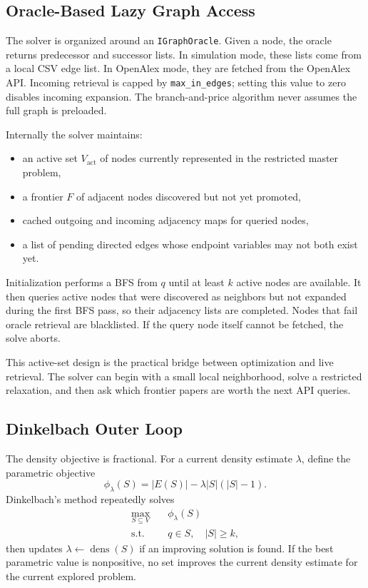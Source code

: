 \documentclass[11pt]{article}
\newcommand{\Vactive}{V_{\mathrm{act}}}
\newcommand{\frontier}{F}
\newcommand{\dens}{\operatorname{dens}}
\begin{document}
\subsection{Oracle-Based Lazy Graph Access}

The solver is organized around an \texttt{IGraphOracle}. Given a node, the
oracle returns predecessor and successor lists. In simulation mode, these lists
come from a local CSV edge list. In OpenAlex mode, they are fetched from the
OpenAlex API. Incoming retrieval is capped by \texttt{max\_in\_edges}; setting
this value to zero disables incoming expansion. The branch-and-price algorithm
never assumes the full graph is preloaded.

Internally the solver maintains:
\begin{itemize}[leftmargin=1.1cm]
  \item an active set $\Vactive$ of nodes currently represented in the restricted
  master problem,
  \item a frontier $\frontier$ of adjacent nodes discovered but not yet promoted,
  \item cached outgoing and incoming adjacency maps for queried nodes,
  \item a list of pending directed edges whose endpoint variables may not both
  exist yet.
\end{itemize}

Initialization performs a BFS from $q$ until at least $k$ active nodes are
available. It then queries active nodes that were discovered as neighbors but
not expanded during the first BFS pass, so their adjacency lists are completed.
Nodes that fail oracle retrieval are blacklisted. If the query node itself
cannot be fetched, the solve aborts.

This active-set design is the practical bridge between optimization and live
retrieval. The solver can begin with a small local neighborhood, solve a
restricted relaxation, and then ask which frontier papers are worth the next API
queries.

\subsection{Dinkelbach Outer Loop}

The density objective is fractional. For a current density estimate $\lambda$,
define the parametric objective
\begin{equation}
  \phi_\lambda(S) = |E(S)| - \lambda |S|(|S|-1).
  \label{eq:parametric}
\end{equation}
Dinkelbach's method repeatedly solves
\begin{align}
  \max_{S\subseteq V}\quad & \phi_\lambda(S)\\
  \text{s.t.}\quad & q\in S,\quad |S|\geq k,
\end{align}
then updates $\lambda \leftarrow \dens(S)$ if an improving solution is found.
If the best parametric value is nonpositive, no set improves the current density
estimate for the current explored problem.
\end{document}
